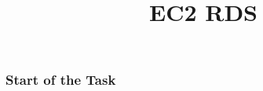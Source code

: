 \documentclass{beamer}
\title{EC2 RDS}
\begin{document}
\date{}
\frame{\titlepage}

	\begin{frame}[fragile]
		\frametitle{Start of the Task}

	\end{frame}
	
\end{document}
